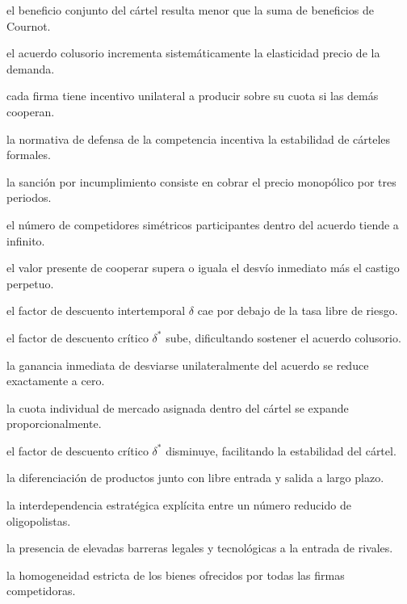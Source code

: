 \begin{opts}
    \item el beneficio conjunto del cártel resulta menor que la suma de beneficios de Cournot.
    \item el acuerdo colusorio incrementa sistemáticamente la elasticidad precio de la demanda.
    \item cada firma tiene incentivo unilateral a producir sobre su cuota si las demás cooperan.
    \item la normativa de defensa de la competencia incentiva la estabilidad de cárteles formales.
\end{opts}

\begin{opts}
    \item la sanción por incumplimiento consiste en cobrar el precio monopólico por tres periodos.
    \item el número de competidores simétricos participantes dentro del acuerdo tiende a infinito.
    \item el valor presente de cooperar supera o iguala el desvío inmediato más el castigo perpetuo.
    \item el factor de descuento intertemporal $\delta$ cae por debajo de la tasa libre de riesgo.
\end{opts}

\begin{opts}
    \item el factor de descuento crítico $\delta^*$ sube, dificultando sostener el acuerdo colusorio.
    \item la ganancia inmediata de desviarse unilateralmente del acuerdo se reduce exactamente a cero.
    \item la cuota individual de mercado asignada dentro del cártel se expande proporcionalmente.
    \item el factor de descuento crítico $\delta^*$ disminuye, facilitando la estabilidad del cártel.
\end{opts}

\begin{opts}
    \item la diferenciación de productos junto con libre entrada y salida a largo plazo.
    \item la interdependencia estratégica explícita entre un número reducido de oligopolistas.
    \item la presencia de elevadas barreras legales y tecnológicas a la entrada de rivales.
    \item la homogeneidad estricta de los bienes ofrecidos por todas las firmas competidoras.
\end{opts}


